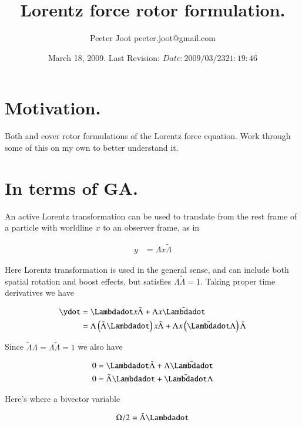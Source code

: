 \documentclass{article}
\title{ Lorentz force rotor formulation. }
\author{Peeter Joot \quad peeter.joot@gmail.com }
\date{ March 18, 2009.  Last Revision: $Date: 2009/03/23 21:19:46 $ }
\newcommand{\reverse}[1]{\tilde{{#1}}}
\begin{document}
\maketitle{}
\tableofcontents

\section{ Motivation. }

Both \cite{baylis-2007} and \cite{doran2003gap} cover rotor formulations
of the Lorentz force equation.  Work through some of this on my own to 
better understand it.

\section{ In terms of GA. }

An active Lorentz transformation can be used to translate from the rest frame of a particle with worldline $x$ to 
an observer frame, as in

\begin{align}\label{eqn:LorentzTx}
y &= \Lambda x \reverse{\Lambda}
\end{align}

Here Lorentz transformation is used in the general sense, and can include both spatial rotation and boost effects, but satisfies $\Lambda\reverse{\Lambda} = 1$.  Taking proper time derivatives we have

\begin{align*}
\ydot 
&= \Lambdadot x \reverse{\Lambda} + \Lambda x \reverse{\Lambdadot} \\
&= \Lambda \left(\reverse{\Lambda} \Lambdadot\right) x \reverse{\Lambda} + \Lambda x \left(\reverse{\Lambdadot} \Lambda \right) \reverse{\Lambda} \\
\end{align*}

Since $\reverse{\Lambda}\Lambda = \Lambda\reverse{\Lambda} = 1$ we also have

\begin{align*}
0 &= \Lambdadot\reverse{\Lambda} + \Lambda\reverse{\Lambdadot}  \\
0 &= \reverse{\Lambda}\Lambdadot + \reverse{\Lambdadot}\Lambda
\end{align*}

Here's where a bivector variable 

\begin{align}
\Omega/2 = \reverse{\Lambda} \Lambdadot
\end{align}
\end{document}
